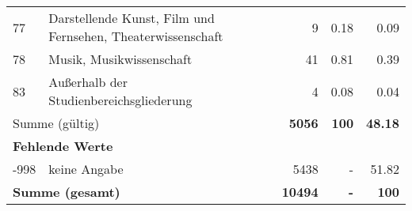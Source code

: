 \begin{longtable}{lXrrr}
        77 & \multicolumn{1}{X}{Darstellende Kunst, Film und Fernsehen, Theaterwissenschaft} & %
          \num{9} &
          \num[round-mode=places,round-precision=2]{0.18} &
          \num[round-mode=places,round-precision=2]{0.09} \\

        78 & \multicolumn{1}{X}{Musik, Musikwissenschaft} & %
          \num{41} &
          \num[round-mode=places,round-precision=2]{0.81} &
          \num[round-mode=places,round-precision=2]{0.39} \\

        83 & \multicolumn{1}{X}{Außerhalb der Studienbereichsgliederung} & %
          \num{4} &
          \num[round-mode=places,round-precision=2]{0.08} &
          \num[round-mode=places,round-precision=2]{0.04} \\

     \midrule
     \multicolumn{2}{l}{Summe (gültig)} &
       \textbf{\num{5056}} &
     \textbf{\num{100}} &
       \textbf{\num[round-mode=places,round-precision=2]{48.18}} \\
     \multicolumn{5}{l}{\textbf{Fehlende Werte}}\\
       -998 &
       keine Angabe &
         \num{5438} &
        - &
         \num[round-mode=places,round-precision=2]{51.82} \\
     \midrule
     \multicolumn{2}{l}{\textbf{Summe (gesamt)}} &
          \textbf{\num{10494}} &
        \textbf{-} &
        \textbf{\num{100}} \\
     \bottomrule
     \end{longtable}
     
